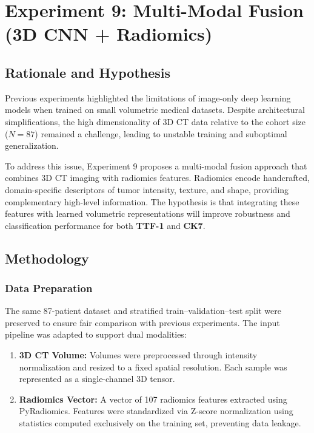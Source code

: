 \section{Experiment 9: Multi-Modal Fusion (3D CNN + Radiomics)}

\subsection{Rationale and Hypothesis}
Previous experiments highlighted the limitations of image-only deep learning models when trained on small volumetric medical datasets. Despite architectural simplifications, the high dimensionality of 3D CT data relative to the cohort size ($N=87$) remained a challenge, leading to unstable training and suboptimal generalization.

To address this issue, Experiment 9 proposes a multi-modal fusion approach that combines 3D CT imaging with radiomics features. Radiomics encode handcrafted, domain-specific descriptors of tumor intensity, texture, and shape, providing complementary high-level information. The hypothesis is that integrating these features with learned volumetric representations will improve robustness and classification performance for both \textbf{TTF-1} and \textbf{CK7}.

\subsection{Methodology}

\subsubsection{Data Preparation}
The same 87-patient dataset and stratified train--validation--test split were preserved to ensure fair comparison with previous experiments. The input pipeline was adapted to support dual modalities:
\begin{enumerate}
    \item \textbf{3D CT Volume:} Volumes were preprocessed through intensity normalization and resized to a fixed spatial resolution. Each sample was represented as a single-channel 3D tensor.
    \item \textbf{Radiomics Vector:} A vector of 107 radiomics features extracted using PyRadiomics. Features were standardized via Z-score normalization using statistics computed exclusively on the training set, preventing data leakage.
\end{enumerate}


